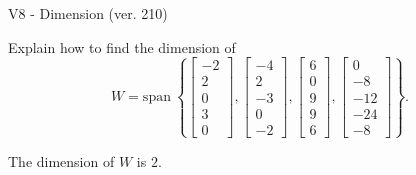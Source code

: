 \begin{exercise}
  \begin{exerciseTitle}V8 - Dimension (ver. 210)\end{exerciseTitle}
  \begin{exerciseStatement}
    Explain how to find the dimension of 
\[W=\mathrm{span}\ \left\{\left[\begin{array}{r}
-2 \\
2 \\
0 \\
3 \\
0
\end{array}\right] , \left[\begin{array}{r}
-4 \\
2 \\
-3 \\
0 \\
-2
\end{array}\right] , \left[\begin{array}{r}
6 \\
0 \\
9 \\
9 \\
6
\end{array}\right] , \left[\begin{array}{r}
0 \\
-8 \\
-12 \\
-24 \\
-8
\end{array}\right]\right\}.\]



  \end{exerciseStatement}
  \begin{exerciseAnswer}
   The dimension of \(W\) is  \(2\).
  


  \end{exerciseAnswer}
\end{exercise}